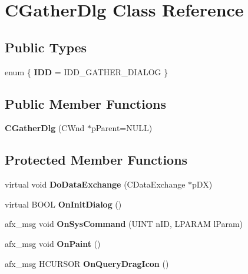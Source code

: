 \hypertarget{class_c_gather_dlg}{\section{C\-Gather\-Dlg Class Reference}
\label{class_c_gather_dlg}
}
\subsection*{Public Types}
\begin{DoxyCompactItemize}
\item 
enum \{ {\bfseries I\-D\-D} =  I\-D\-D\-\_\-\-G\-A\-T\-H\-E\-R\-\_\-\-D\-I\-A\-L\-O\-G
 \}
\end{DoxyCompactItemize}
\subsection*{Public Member Functions}
\begin{DoxyCompactItemize}
\item 
\hypertarget{class_c_gather_dlg_ace8db41669e274c13b5a0c26faad18a5}{{\bfseries C\-Gather\-Dlg} (C\-Wnd $\ast$p\-Parent=N\-U\-L\-L)}\label{class_c_gather_dlg_ace8db41669e274c13b5a0c26faad18a5}

\end{DoxyCompactItemize}
\subsection*{Protected Member Functions}
\begin{DoxyCompactItemize}
\item 
\hypertarget{class_c_gather_dlg_a798c49d0f850374270d7094b8afe08cd}{virtual void {\bfseries Do\-Data\-Exchange} (C\-Data\-Exchange $\ast$p\-D\-X)}\label{class_c_gather_dlg_a798c49d0f850374270d7094b8afe08cd}

\item 
\hypertarget{class_c_gather_dlg_ac20b3c014bc73ff24486c0f4473faf41}{virtual B\-O\-O\-L {\bfseries On\-Init\-Dialog} ()}\label{class_c_gather_dlg_ac20b3c014bc73ff24486c0f4473faf41}

\item 
\hypertarget{class_c_gather_dlg_aa26494c591ae1553cace43ea3cd71bc3}{afx\-\_\-msg void {\bfseries On\-Sys\-Command} (U\-I\-N\-T n\-I\-D, L\-P\-A\-R\-A\-M l\-Param)}\label{class_c_gather_dlg_aa26494c591ae1553cace43ea3cd71bc3}

\item 
\hypertarget{class_c_gather_dlg_a3f6c04093f1a6fd110ee3ea45772b7d0}{afx\-\_\-msg void {\bfseries On\-Paint} ()}\label{class_c_gather_dlg_a3f6c04093f1a6fd110ee3ea45772b7d0}

\item 
\hypertarget{class_c_gather_dlg_acb8a8a226932b3d906de18917e9a3790}{afx\-\_\-msg H\-C\-U\-R\-S\-O\-R {\bfseries On\-Query\-Drag\-Icon} ()}\label{class_c_gather_dlg_acb8a8a226932b3d906de18917e9a3790}

\end{DoxyCompactItemize}
